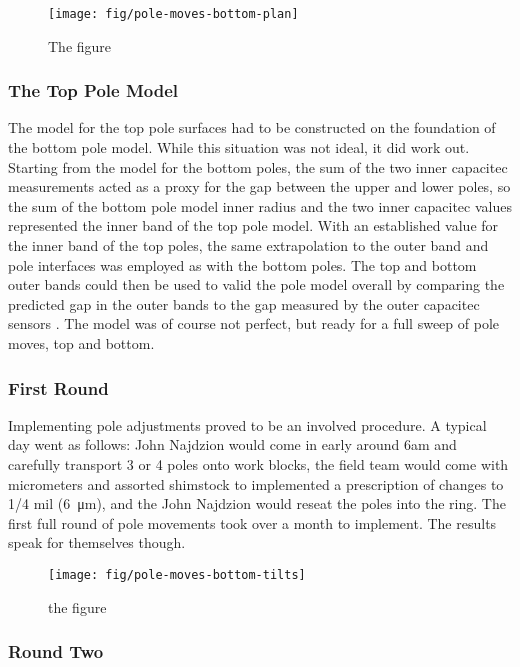 \begin{figure}
\texttt{[image: fig/pole-moves-bottom-plan]}
\caption{The figure}
\label{fig:bottom-pole-adjustment-plan}
\end{figure}

\subsubsection{The Top Pole Model}

The model for the top pole surfaces had to be constructed on the foundation of the bottom pole model.  While this situation was not ideal, it did work out.  Starting from the model for the bottom poles, the sum of the two inner capacitec measurements acted as a proxy for the gap between the upper and lower poles, so the sum of the bottom pole model inner radius and the two inner capacitec values represented the inner band of the top pole model.  With an established value for the inner band of the top poles, the same extrapolation to the outer band and pole interfaces was employed as with the bottom poles.  The top and bottom outer bands could then be used to valid the pole model overall by comparing the predicted gap in the outer bands to the gap measured by the outer capacitec sensors .  The model was of course not perfect, but ready for a full sweep of pole moves, top and bottom.

\subsubsection{First Round}

Implementing pole adjustments proved to be an involved procedure.  A typical day went as follows: John Najdzion would come in early around 6am and carefully transport 3 or 4 poles onto work blocks, the field team would come with micrometers and assorted shimstock to implemented a prescription of changes to 1/4 mil (\SI{6}{\micro\meter}), and the John Najdzion  would reseat the poles into the ring.  The first full round of pole movements took over a month to implement.  The results speak for themselves though.

\begin{figure}
\texttt{[image: fig/pole-moves-bottom-tilts]}
\caption{the figure}
\label{fig:pole-moves-bottom-tilts}
\end{figure}

\subsubsection{Round Two}

